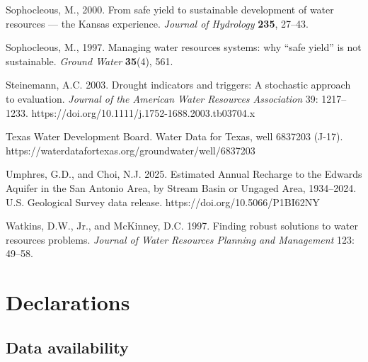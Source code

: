 Sophocleous, M., 2000. From safe yield to sustainable development of water resources --- the
Kansas experience. \emph{Journal of Hydrology} \textbf{235}, 27--43.

Sophocleous, M., 1997. Managing water resources systems: why ``safe yield'' is not
sustainable. \emph{Ground Water} \textbf{35}(4), 561.

Steinemann, A.C. 2003. Drought indicators and triggers: A stochastic
approach to evaluation. \emph{Journal of the American Water Resources
Association} 39: 1217--1233.
https://doi.org/10.1111/j.1752-1688.2003.tb03704.x

Texas Water Development Board. Water Data for Texas, well 6837203
(J-17). https://waterdatafortexas.org/groundwater/well/6837203

Umphres, G.D., and Choi, N.J. 2025. Estimated Annual Recharge to the
Edwards Aquifer in the San Antonio Area, by Stream Basin or Ungaged
Area, 1934--2024. U.S. Geological Survey data release.
https://doi.org/10.5066/P1BI62NY

Watkins, D.W., Jr., and McKinney, D.C. 1997. Finding robust solutions to
water resources problems. \emph{Journal of Water Resources Planning and
Management} 123: 49--58.

\section*{Declarations}

\subsection*{Data availability}

